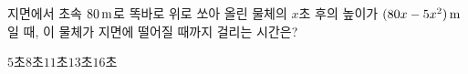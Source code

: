 지면에서 초속 $80\mkern3mu \mathrm{m}$로 똑바로 위로 쏘아 올린 물체의 $x$초 후의 높이가 $(80x-5x^2)\mkern3mu \mathrm{m}$일 때, 이 물체가 지면에 떨어질 때까지 걸리는 시간은?
\begin{choices32}{$5$초}{$8$초}{$11$초}{$13$초}{$16$초}\end{choices32}
